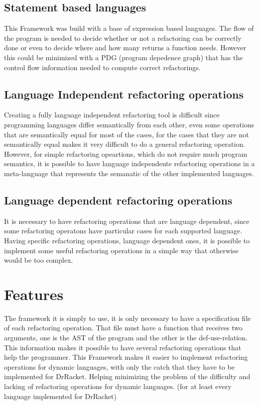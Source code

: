 \subsection{Statement based languages}
This Framework was build with a base of expression based languages. The flow of
the program is needed to decide whether or not a refactoring can be correctly done
or even to decide where and how many returns a function needs. However this could
be minimized with a PDG (program depedence graph) that has the control flow information
needed to compute correct refactorings.

\subsection{Language Independent refactoring operations}
Creating a fully language independent refactoring tool is difficult since programming
languages differ semantically from each other, even some operations that are semantically
equal for most of the cases, for the cases that they are not semantically equal makes it very
difficult to do a general refactoring operation.
However, for simple refactoring opeartions, which do not require much program semantics,
it is possible to have language independente refactoring operations in a meta-language that
represents the semanatic of the other implemented languages. %

\subsection{Language dependent refactoring operations}
It is necessary to have refactoring operations that are language dependent, since
some refactoring operatons have particular cases for each supported language.
Having specific refactoring operations, language dependent ones, it is possible
to implement some useful refactoring operations in a simple way that otherwise would
be too complex.

\section{Features} %
The framework it is simply to use, it is only necessary to have a specification file
of each refactoring operation.
That file must have a function that receives two arguments,
one is the AST of the program and the other is the def-use-relation.
This information makes it possible to have several refactoring operations that help
the programmer.
This Framework makes it easier to implement refactoring operations for dynamic languages,
with only the catch that they have to be implemented for DrRacket. Helping minimizing
the problem of the difficulty and lacking of refactoring operations for dynamic languages.
(for at least every language implemented for DrRacket)

